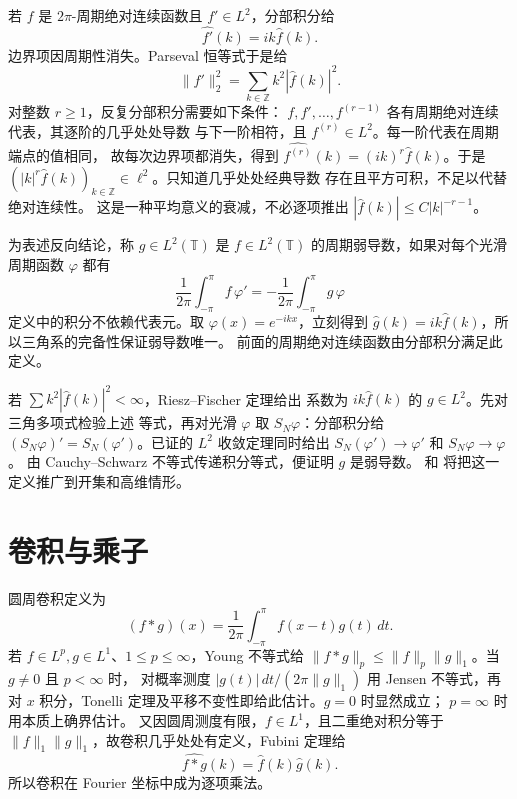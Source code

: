 若 \(f\) 是 \(2\pi\)-周期绝对连续函数且 \(f'\in L^2\)，分部积分给
\begin{equation}\label{eq:fourier-derivative-coefficients}
 \widehat{f'}(k)=ik\widehat f(k).
\end{equation}
边界项因周期性消失。Parseval 恒等式于是给
\[
 \|f'\|_2^2=\sum_{k\in\mathbb Z}k^2|\widehat f(k)|^2.
\]
对整数 \(r\ge1\)，反复分部积分需要如下条件：
\(f,f',\ldots,f^{(r-1)}\) 各有周期绝对连续代表，其逐阶的几乎处处导数
与下一阶相符，且 \(f^{(r)}\in L^2\)。每一阶代表在周期端点的值相同，
故每次边界项都消失，得到
\(\widehat{f^{(r)}}(k)=(ik)^r\widehat f(k)\)。于是
\((|k|^r\widehat f(k))_{k\in\mathbb Z}\in\ell^2\)。只知道几乎处处经典导数
存在且平方可积，不足以代替绝对连续性。
这是一种平均意义的衰减，不必逐项推出
\(|\widehat f(k)|\le C|k|^{-r-1}\)。

为表述反向结论，称 \(g\in L^2(\mathbb T)\) 是 \(f\in L^2(\mathbb T)\)
的周期弱导数，如果对每个光滑周期函数 \(\varphi\) 都有
\[
 \frac1{2\pi}\int_{-\pi}^{\pi} f\,\varphi'
 =-\frac1{2\pi}\int_{-\pi}^{\pi}g\,\varphi
\]
定义中的积分不依赖代表元。取 \(\varphi(x)=e^{-ikx}\)，立刻得到
\(\widehat g(k)=ik\widehat f(k)\)，所以三角系的完备性保证弱导数唯一。
前面的周期绝对连续函数由分部积分满足此定义。

若 \(\sum k^2|\widehat f(k)|^2<\infty\)，Riesz--Fischer 定理给出
系数为 \(ik\widehat f(k)\) 的 \(g\in L^2\)。先对三角多项式检验上述
等式，再对光滑 \(\varphi\) 取 \(S_N\varphi\)：分部积分给
\((S_N\varphi)'=S_N(\varphi')\)。已证的 \(L^2\) 收敛定理同时给出
\(S_N(\varphi')\to\varphi'\) 和 \(S_N\varphi\to\varphi\)。
由 Cauchy--Schwarz 不等式传递积分等式，便证明 \(g\) 是弱导数。
和
将把这一定义推广到开集和高维情形。

\section{卷积与乘子}

圆周卷积定义为
\[
 (f*g)(x)=\frac1{2\pi}\int_{-\pi}^{\pi}f(x-t)g(t)\,dt.
\]
若 \(f\in L^p,g\in L^1\)、\(1\le p\le\infty\)，Young 不等式给
\(\|f*g\|_p\le\|f\|_p\|g\|_1\)。当 \(g\ne0\) 且 \(p<\infty\) 时，
对概率测度 \(|g(t)|\,dt/(2\pi\|g\|_1)\) 用 Jensen 不等式，再对 \(x\)
积分，Tonelli 定理及平移不变性即给此估计。\(g=0\) 时显然成立；
\(p=\infty\) 时用本质上确界估计。
又因圆周测度有限，\(f\in L^1\)，且二重绝对积分等于
\(\|f\|_1\|g\|_1\)，故卷积几乎处处有定义，Fubini 定理给
\begin{equation}\label{eq:circle-convolution-coefficients}
 \widehat{f*g}(k)=\widehat f(k)\widehat g(k).
\end{equation}
所以卷积在 Fourier 坐标中成为逐项乘法。

